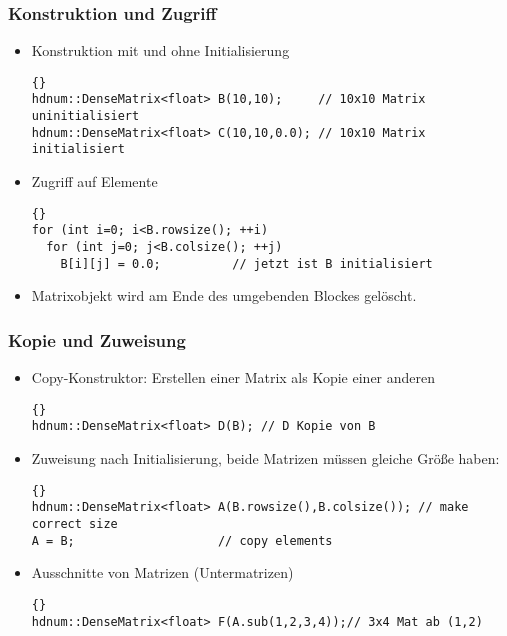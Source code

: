 \begin{frame}[fragile]
\frametitle{Konstruktion und Zugriff}
\begin{itemize}
\item Konstruktion mit und ohne Initialisierung\\
{\footnotesize{\begin{lstlisting}{}
hdnum::DenseMatrix<float> B(10,10);     // 10x10 Matrix uninitialisiert
hdnum::DenseMatrix<float> C(10,10,0.0); // 10x10 Matrix initialisiert
\end{lstlisting}}}
\item Zugriff auf Elemente\\
{\footnotesize{\begin{lstlisting}{}
for (int i=0; i<B.rowsize(); ++i)
  for (int j=0; j<B.colsize(); ++j)
    B[i][j] = 0.0;          // jetzt ist B initialisiert
\end{lstlisting}}}
\item Matrixobjekt wird am Ende des umgebenden Blockes gelöscht.
\end{itemize}
\end{frame}

\begin{frame}[fragile]
\frametitle{Kopie und Zuweisung}
\begin{itemize}
\item Copy-Konstruktor: Erstellen einer Matrix als Kopie einer anderen
{\footnotesize{\begin{lstlisting}{}
hdnum::DenseMatrix<float> D(B); // D Kopie von B
\end{lstlisting}}}
\item Zuweisung nach Initialisierung, beide Matrizen müssen gleiche Größe haben:
{\footnotesize{\begin{lstlisting}{}
hdnum::DenseMatrix<float> A(B.rowsize(),B.colsize()); // make correct size
A = B;                    // copy elements
\end{lstlisting}}}
\item Ausschnitte von Matrizen (Untermatrizen)\\
{\footnotesize{\begin{lstlisting}{}
hdnum::DenseMatrix<float> F(A.sub(1,2,3,4));// 3x4 Mat ab (1,2)
\end{lstlisting}}}
\end{itemize}
\end{frame}

